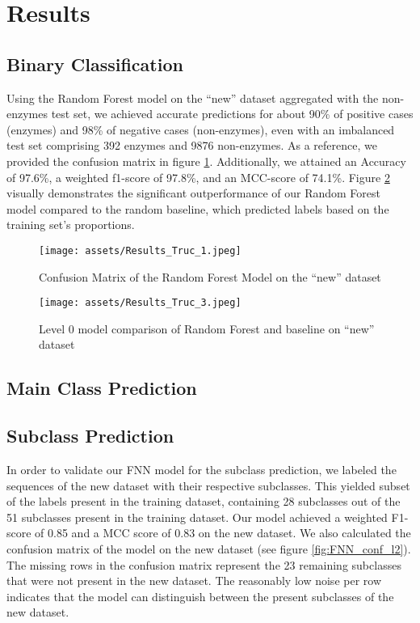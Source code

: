 \documentclass{bioinfo}
\begin{document}
\section{Results}	

\subsection{Binary Classification}\label{sec:RF_level0}
Using the Random Forest model on the ``new'' dataset aggregated with the non-enzymes test set, we achieved accurate
predictions for about 90\% of positive cases (enzymes) and 98\% of negative
cases (non-enzymes), even with an imbalanced test set comprising 392
enzymes and 9876 non-enzymes. As a reference, we provided the confusion
matrix in figure \ref{fig:RF_conf_l0}.
Additionally, we attained an Accuracy of 97.6\%, a weighted f1-score of
97.8\%, and an MCC-score of 74.1\%. Figure \ref{fig:RF_scores_l0} visually demonstrates the significant outperformance of our Random Forest model compared to the random baseline, which predicted labels based on the training set's proportions.

\begin{figure}[!tb]
\texttt{[image: assets/Results\_Truc\_1.jpeg]}
\caption{Confusion Matrix of the Random Forest Model on the “new” dataset}\label{fig:RF_conf_l0}
\end{figure}

\begin{figure}[!ht]
\texttt{[image: assets/Results\_Truc\_3.jpeg]}
\caption{Level 0 model comparison of Random Forest and baseline on “new” dataset}\label{fig:RF_scores_l0}
\end{figure}

\subsection{Main Class Prediction}

\lipsum[1]

\subsection{Subclass Prediction}
In order to validate our FNN model for the subclass prediction, we labeled the sequences of the new dataset with their respective subclasses.
This yielded subset of the labels present in the training dataset, containing 28 subclasses out of the 51 subclasses present in the training dataset.
Our model achieved a weighted F1-score of 0.85 and a MCC score of 0.83 on the new dataset. 
We also calculated the confusion matrix of the model on the new dataset (see figure \ref{fig:FNN_conf_l2}).
The missing rows in the confusion matrix represent the 23 remaining subclasses that were not present in the new dataset.
The reasonably low noise per row indicates that the model can distinguish between the present subclasses of the new dataset.
\end{document}
